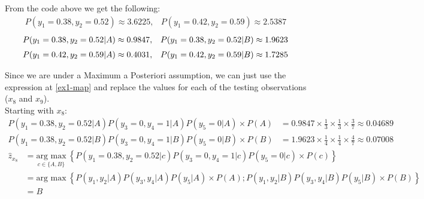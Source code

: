 \documentclass[12pt]{article}
\begin{document}
\begin{enumerate}[leftmargin=\labelsep]
\begin{enumerate}
          From the code above we get the following:
          \[
              \begin{array}{cc}
                  P(y_1 = 0.38, y_2 = 0.52) \approx 3.6225, &
                  P(y_1 = 0.42, y_2 = 0.59) \approx 2.5387
              \end{array}
          \]
          \[
              \begin{array}{cc}
                  P(y_1 = 0.38, y_2 = 0.52 | A) \approx 0.9847, &
                  P(y_1 = 0.38, y_2 = 0.52 | B) \approx 1.9623     \\[\medskipamount]
                  P(y_1 = 0.42, y_2 = 0.59 | A) \approx 0.4031, &
                  P(y_1 = 0.42, y_2 = 0.59 | B) \approx 1.7285
              \end{array}
          \]

          Since we are under a Maximum a Posteriori assumption, we can just use the expression at \eqref{ex1-map}
          and replace the values for each of the testing observations ($x_8$ and $x_9$).\\
          Starting with $x_8$:
          $$
              \begin{aligned}
                  P(y_1 = 0.38, y_2 = 0.52 | A) P(y_3 = 0, y_4 = 1 | A) P(y_5 = 0 | A) \times P(A) & = 0.9847 \times \frac{1}{3} \times \frac{1}{3} \times \frac{3}{7} \approx 0.04689 \\
                  P(y_1 = 0.38, y_2 = 0.52 | B) P(y_3 = 0, y_4 = 1 | B) P(y_5 = 0 | B) \times P(B) & = 1.9623 \times \frac{1}{4} \times \frac{1}{4} \times \frac{4}{7} \approx 0.07008
              \end{aligned}
          $$
          $$
              \begin{aligned}
                  \hat{z}_{x_8} & = \underset{c \in \{A, B\}}{\text{arg max}} \medspace \left\{P(y_1 = 0.38, y_2 = 0.52 | c) P(y_3 = 0, y_4 = 1 | c) P(y_5 = 0 | c) \times P(c)\right\}  \\
                          & = \text{arg max} \medspace \left\{P(y_1, y_2 | A) P(y_3, y_4 | A) P(y_5 | A) \times P(A); P(y_1, y_2 | B) P(y_3, y_4 | B) P(y_5 | B) \times P(B)\right\} \\
                          & = B
              \end{aligned}
          $$


\end{enumerate}
\end{enumerate}
\end{document}
